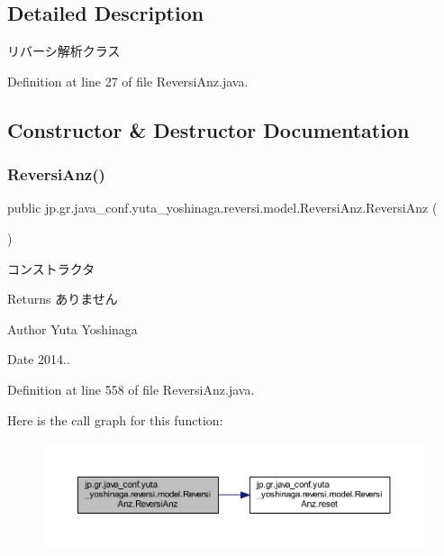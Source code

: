 \subsection{Detailed Description}
リバーシ解析クラス 

Definition at line 27 of file Reversi\+Anz.\+java.



\subsection{Constructor \& Destructor Documentation}
\mbox{\label{classjp_1_1gr_1_1java__conf_1_1yuta__yoshinaga_1_1reversi_1_1model_1_1_reversi_anz_a130d4d7b3641a385209d1596c2f3e024}} 
\subsubsection{\texorpdfstring{Reversi\+Anz()}{ReversiAnz()}}
{\footnotesize\ttfamily public jp.\+gr.\+java\+\_\+conf.\+yuta\+\_\+yoshinaga.\+reversi.\+model.\+Reversi\+Anz.\+Reversi\+Anz (\begin{DoxyParamCaption}{ }\end{DoxyParamCaption})}



コンストラクタ 

\begin{DoxyReturn}{Returns}
ありません 
\end{DoxyReturn}
\begin{DoxyAuthor}{Author}
Yuta Yoshinaga 
\end{DoxyAuthor}
\begin{DoxyDate}{Date}
2014.. 
\end{DoxyDate}


Definition at line 558 of file Reversi\+Anz.\+java.

Here is the call graph for this function\+:\nopagebreak
\begin{figure}[H]
\begin{center}
\leavevmode
\includegraphics[width=350pt]{classjp_1_1gr_1_1java__conf_1_1yuta__yoshinaga_1_1reversi_1_1model_1_1_reversi_anz_a130d4d7b3641a385209d1596c2f3e024_cgraph}
\end{center}
\end{figure}


